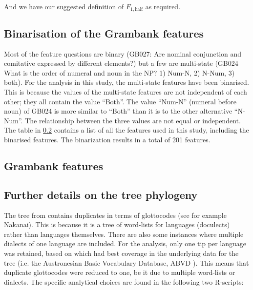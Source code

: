 \documentclass[12pt,letterpaper]{article}
\begin{document}
\noindent And we have our suggested definition of $F_{1,\text{half}}$ as required.

\FloatBarrier

\subsection{Binarisation of the Grambank features}
\label{supp:dataset_details}
Most of the feature questions are binary (GB027: Are nominal conjunction and comitative expressed by different elements?) but a few are multi-state (GB024 What is the order of numeral and noun in the NP? 1) Num-N, 2) N-Num, 3) both). For the analysis in this study, the multi-state features have been binarised. This is because the values of the multi-state features are not independent of each other; they all contain the value ``Both''. The value ``Num-N'' (numeral before noun) of GB024 is more similar to ``Both'' than it is to the other alternative ``N-Num''. The relationship between the three values are not equal or independent. The table in \ref{Grambank_features} contains a list of all the features used in this study, including the binarised features. The binarization results in a total of 201 features. 

\FloatBarrier


\subsection{Grambank features}
\label{Grambank_features}

\begin{landscape}

\end{landscape}
\newpage


\FloatBarrier

\subsection{Further details on the tree phylogeny}
\label{supp:tree_details}

The tree from \citet{grayetal_2009} contains duplicates in terms of glottocodes (see for example Nakanai). This is because it is a tree of word-lists for languages (doculects) rather than languages themselves. There are also some instances where multiple dialects of one language are included. For the analysis, only one tip per language was retained, based on which had best coverage in the underlying data for the tree (i.e. the Austronesian Basic Vocabulary Database, ABVD \citep{ABVD}). This means that duplicate glottocodes were reduced to one, be it due to multiple word-lists or dialects. The specific analytical choices are found in the following two R-scripts:
\end{document}
